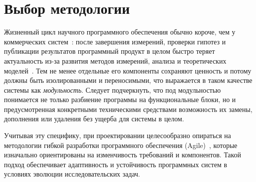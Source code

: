 \section{Выбор методологии}

%
Жизненный цикл научного программного обеспечения обычно короче, чем у коммерческих систем~\cite{lifecycle-lenhardt2014data, Przedzinski2020PhD}: после завершения измерений, проверки гипотез и публикации результатов программный продукт в целом быстро теряет актуальность из-за развития методов измерений, анализа и теоретических моделей~\cite{hep-roadmap-Albrecht2019}. Тем не менее отдельные его компоненты сохраняют ценность и потому должны быть изолированными и переносимыми, что выражается в таком качестве системы как \emph{модульность}. Следует подчеркнуть, что под модульностью понимается не только разбиение программы на функциональные блоки, но и предусмотренная конкретными техническими средствами возможность их замены, дополнения или удаления без ущерба для системы в целом.

Учитывая эту специфику, при проектировании целесообразно опираться на методологии гибкой разработки программного обеспечения (Agile)~\cite{AgileManifesto2001}, которые изначально ориентированы на изменчивость требований и компонентов. Такой подход обеспечивает адаптивность и устойчивость программных систем в условиях эволюции исследовательских задач.


